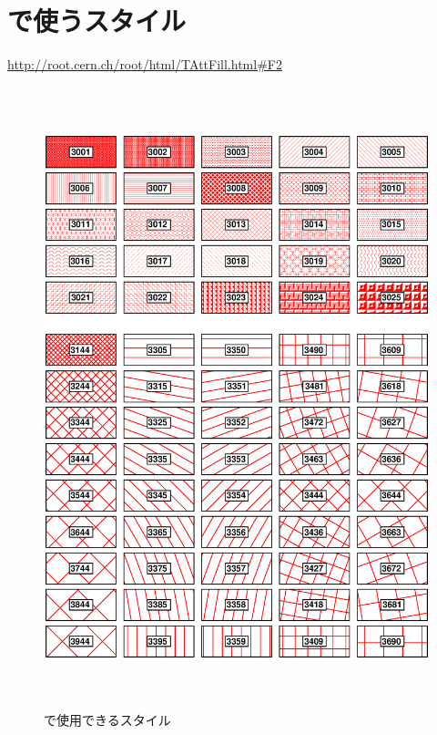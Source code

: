 \documentclass{jarticle}
\begin{document}
 \section{\ROOT で使うスタイル}

 \url{http://root.cern.ch/root/html/TAttFill.html#F2}
 \begin{figure}[htbp]
  \begin{center}
   \includegraphics[height = 180mm]{./picture/fillpatterns.eps}
  \end{center}
  \caption{\ROOT で使用できるスタイル}
  \label{Fig:fillpatterns}
 \end{figure}
\end{document}
